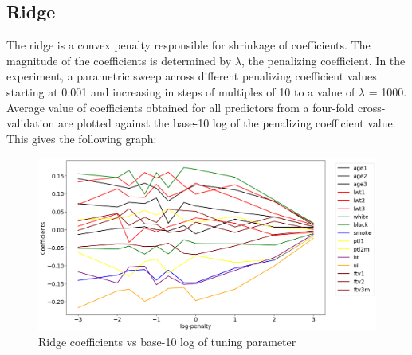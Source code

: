 \documentclass[a4paper,12pt]{article}
\begin{document}
		\newpage
		\subsection{Ridge}
		The ridge is a convex penalty responsible for shrinkage of coefficients. The magnitude of the coefficients is determined by $\lambda$, the penalizing coefficient. In the experiment, a parametric sweep across different penalizing coefficient values starting at 0.001 and increasing in steps of multiples of 10 to a value of $\lambda$ = 1000. Average value of coefficients obtained for all predictors from a four-fold cross-validation are plotted against the base-10 log of the penalizing coefficient value. This gives the following graph:
		\begin{figure}[H]
		     \centering
            \includegraphics[scale=0.4]{ridge-path.png}
            \caption{Ridge coefficients vs base-10 log of tuning parameter}
        \end{figure}
        
\end{document}
